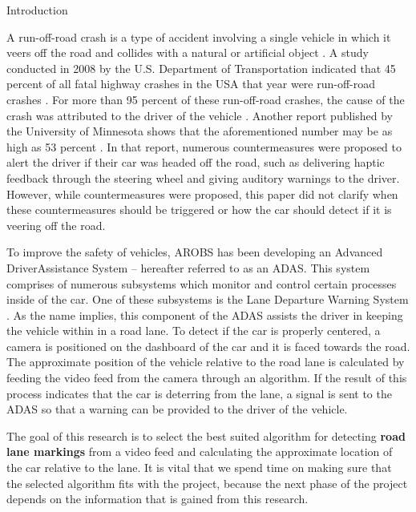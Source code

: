 \documentclass{matthijs}
\begin{document}
	\begin{hoofdstuk}{Introduction}

		A run-off-road crash is a type of accident involving a single vehicle in which it veers off the road and collides with a natural or artificial object \cite{liu2009factors}.
		A study conducted in 2008 by the U.S. Department of Transportation indicated that 45 percent of all fatal highway crashes in the USA that year were run-off-road crashes \cite{dod2011run}.
		For more than 95 percent of these run-off-road crashes, the cause of the crash was attributed to the driver of the vehicle \cite{dod2011run}.
		Another report published by the University of Minnesota shows that the aforementioned number may be as high as 53 percent \cite{edwards2013pilot}.
		In that report, numerous countermeasures were proposed to alert the driver if their car was headed off the road, such as delivering haptic feedback through the steering wheel and giving auditory warnings to the driver.
		However, while countermeasures were proposed, this paper did not clarify when these countermeasures should be triggered or how the car should detect if it is veering off the road.
		
		\bigskip

		To improve the safety of vehicles, AROBS has been developing an Advanced Driver\Hyphdash Assistance System -- hereafter referred to as an ADAS.
		This system comprises of numerous subsystems which monitor and control certain processes inside of the car.
		One of these subsystems is the Lane Departure Warning System \cite{el2020novel}.
		As the name implies, this component of the ADAS assists the driver in keeping the vehicle within in a road lane.
		To detect if the car is properly centered, a camera is positioned on the dashboard of the car and it is faced towards the road.
		The approximate position of the vehicle relative to the road lane is calculated by feeding the video feed from the camera through an algorithm.
		If the result of this process indicates that the car is deterring from the lane, a signal is sent to the ADAS so that a warning can be provided to the driver of the vehicle.
		
		\bigskip

		The goal of this research is to select the best suited algorithm for detecting \textbf{road lane markings} from a video feed and calculating the approximate location of the car relative to the lane.
		It is vital that we spend time on making sure that the selected algorithm fits with the project, because the next phase of the project depends on the information that is gained from this research.


\end{hoofdstuk}
\end{document}

